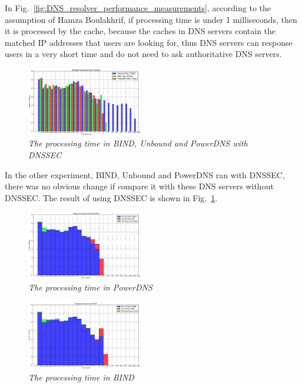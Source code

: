 \documentclass[conference]{IEEEtran}
\begin{document}
In Fig.~\ref{fig:DNS_resolver_performance_measurements}, according to the assumption of Hamza Boulakhrif, if processing time is under 1 milliseconds, then it is processed by the cache, because the caches in DNS servers contain the matched IP addresses that users are looking for, thus DNS servers can response users in a very short time and do not need to ask authoritative DNS servers.
\\

\begin{figure}[hbt!]  
    \centering
    \includegraphics[width=0.45\textwidth]{figure/DNS-resolver-measurement-DNSSEC.jpg}
    \caption{\em The processing time in BIND, Unbound and PowerDNS with DNSSEC \cite{DNS_resolver_performance_measurements} \label{fig:DNS_resolver_performance_measurements_DNSSEC}}
\end{figure}


In the other experiment, BIND, Unbound and PowerDNS ran with DNSSEC, there was no obvious change if compare it with these DNS servers without DNSSEC. The result of using DNSSEC is shown in Fig.~\ref{fig:DNS_resolver_performance_measurements_DNSSEC}.
\\

\begin{figure}[hbt!]  
    \centering
    \includegraphics[width=0.45\textwidth]{figure/Measurement-PowerDNS.jpg}
    \caption{\em The processing time in PowerDNS \cite{DNS_resolver_performance_measurements} \label{fig:Measurements_PowerDNS}}
\end{figure}


\begin{figure}[hbt!]  
    \centering
    \includegraphics[width=0.45\textwidth]{figure/Measurement-BIND.jpg}
    \caption{\em The processing time in BIND \cite{DNS_resolver_performance_measurements} \label{fig:Measurement_BIND}}
\end{figure}
\end{document}
